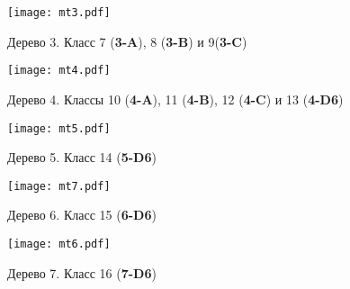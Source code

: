 \begin{figure}[H]
    \centering
    \hspace{0.12\textwidth}
    \texttt{[image: mt3.pdf]}
    \hfill
    \vspace{0.3cm}\vfill
    \hfill
    \caption{Дерево 3. Класс 7 ({\bf 3-A}), 8 ({\bf 3-B}) и 9({\bf 3-C})}
    \label{fig:tree3}
\end{figure}
 
\begin{figure}[H]
    \centering
    \texttt{[image: mt4.pdf]}
    \vspace{0.5cm}\vfill
    \hfill
    \vspace{0.3cm}\vfill
    \hfill
    \caption{Дерево 4. Классы 10 ({\bf 4-A}), 11 ({\bf 4-B}), 12 ({\bf 4-C}) и 13 ({\bf 4-D6})}
    \label{fig:tree4}
\end{figure}

\begin{figure}[H]
    \centering
    \texttt{[image: mt5.pdf]}
    \hfill
    \caption{Дерево 5. Класс 14 ({\bf 5-D6})}
    \label{fig:tree5}
\end{figure}

\begin{figure}[H]
    \centering
    \texttt{[image: mt7.pdf]}
    \hfill
    \caption{Дерево 6. Класс 15 ({\bf 6-D6})}
    \label{fig:tree6}
\end{figure}

\begin{figure}[H]
    \centering
    \texttt{[image: mt6.pdf]}
    \hfill
    \caption{Дерево 7. Класс 16 ({\bf 7-D6})}
    \label{fig:tree7}
\end{figure}
